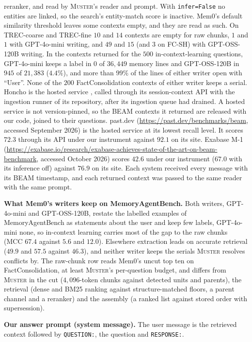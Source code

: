 \documentclass{article}
\newcommand{\sys}{\textsc{Muster}}
\begin{document}
reranker, and read by \sys{}'s reader and prompt. With \texttt{infer=False} no entities are linked, so the search's entity-match score is inactive. Mem0's default similarity threshold leaves some contexts empty, and they are read as such. On TREC-coarse and TREC-fine $10$ and $14$ contexts are empty for raw chunks, $1$ and $1$ with GPT-4o-mini writing, and $49$ and $15$ (and $3$ on FC-SH) with GPT-OSS-120B writing. In the contexts returned for the $500$ in-context-learning questions, GPT-4o-mini keeps a label in $0$ of $36{,}449$ memory lines and GPT-OSS-120B in $945$ of $21{,}383$ ($4.4\%$), and more than $99\%$ of the lines of either writer open with ``User''. None of the $200$ FactConsolidation contexts of either writer keeps a serial.
Honcho is the hosted service \cite{honcho}, called through its session-context API with the ingestion
runner of its repository, after its ingestion queue had drained. A hosted service is not version-pinned,
so the BEAM contexts it returned are released with our code, joined to their questions. past.dev (\url{https://past.dev/benchmarks/beam}, accessed September 2026) is the hosted service at
its lowest recall level. It scores $72.3$ through its API under our instrument against $92.1$ on its site. Exabase M-1 (\url{https://exabase.io/research/exabase-achieves-state-of-the-art-on-beam-benchmark}, accessed October 2026) scores $42.6$ under our instrument ($67.0$ with its inference off) against $76.9$ on its site. Each system received every message with its BEAM timestamp, and each returned
context was passed to the same reader with the same prompt.

\textbf{What Mem0's writers keep on MemoryAgentBench.} Both writers, GPT-4o-mini and GPT-OSS-120B, restate the labelled examples of MemoryAgentBench as statements about the user and keep few labels, GPT-4o-mini none, so in-context learning carries most of the gap to the raw chunks (MCC $67.4$ against $5.6$ and $12.0$). Elsewhere extraction leads on accurate retrieval ($49.9$ and $57.5$ against $46.3$), and neither writer keeps the serials \sys{} resolves conflicts by. The raw-chunk row reads Mem0's uncut top ten on FactConsolidation, at least \sys{}'s per-question budget, and differs from \sys{} in the cut ($4{,}096$-token chunks against detected units and parents), the retrieval (dense and BM25 ranking against structure-matched floors, a parent channel and a reranker) and the assembly (a ranked list against stored order with supersession).

\textbf{Our answer prompt (system message).} The user message is the retrieved context followed by \texttt{QUESTION:}, the question
and \texttt{RESPONSE:}.
\end{document}
